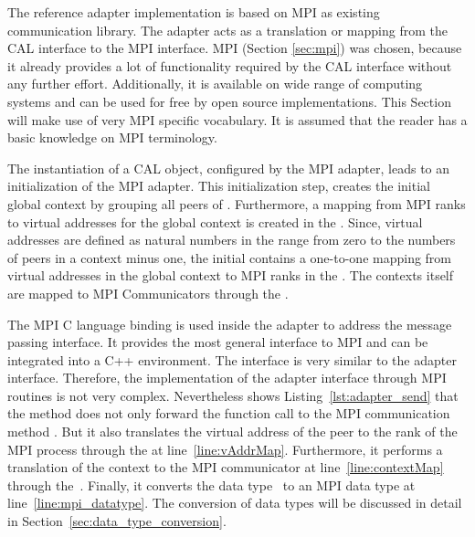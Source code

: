 The reference adapter implementation is based on MPI as existing
communication library. The adapter acts as a translation or mapping
from the CAL interface to the MPI interface.  MPI (Section
\ref{sec:mpi}) was chosen, because it already provides a lot of
functionality required by the CAL interface without any further
effort. Additionally, it is available on wide range of computing
systems and can be used for free by open source implementations. This
Section will make use of very MPI specific vocabulary. It is assumed
that the reader has a basic knowledge on MPI terminology.

The instantiation of a CAL object, configured by the MPI adapter,
leads to an initialization of the MPI adapter. This initialization
step, creates the initial global context by grouping all peers of
.  Furthermore, a mapping from MPI ranks to
virtual addresses for the global context is created in the
. Since, virtual addresses are defined as natural numbers
in the range from zero to the numbers of peers in a context minus one,
the initial  contains a one-to-one mapping from virtual
addresses in the global context to MPI ranks in the
. The contexts itself are mapped to MPI
Communicators through the .


The MPI C language binding is used inside the adapter to address the
message passing interface.  It provides the most general interface to
MPI and can be integrated into a C++ environment.  The interface is
very similar to the adapter interface. Therefore, the implementation
of the adapter interface through MPI routines is not very
complex. Nevertheless shows Listing~\ref{lst:adapter_send} that the
 method does not only forward the function call to
the MPI communication method .  But it also translates
the virtual address  of the peer to the rank of the
MPI process through the  at line~\ref{line:vAddrMap}.
Furthermore, it performs a translation of the context to the MPI
communicator at line~\ref{line:contextMap} through
the~. Finally, it converts the data type~
to an MPI data type at line~\ref{line:mpi_datatype}.  The conversion
of data types will be discussed in detail in
Section~\ref{sec:data_type_conversion}.

